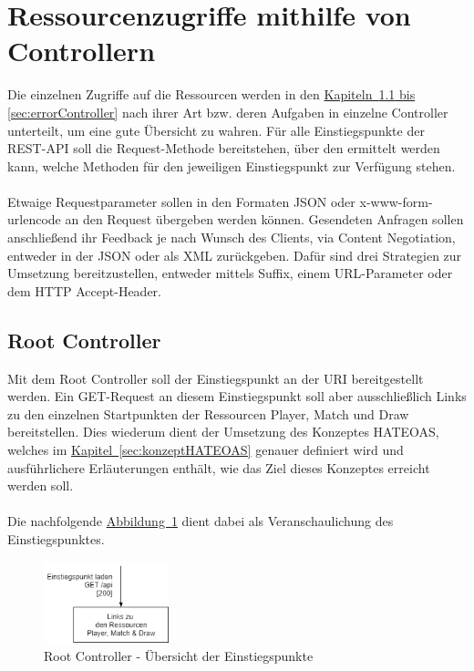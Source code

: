 \section{Ressourcenzugriffe mithilfe von Controllern}
Die einzelnen Zugriffe auf die Ressourcen werden in den \hyperref[sec:rootController, sec:errorController]{Kapiteln~\ref{sec:rootController} bis \ref{sec:errorController}} nach ihrer Art bzw. deren Aufgaben in einzelne Controller unterteilt, um eine gute Übersicht zu wahren. Für alle Einstiegspunkte der \gls{REST}-\gls{API} soll die Request-Methode  bereitstehen, über den ermittelt werden kann, welche Methoden für den jeweiligen Einstiegspunkt zur Verfügung stehen.\\
\\
Etwaige Requestparameter sollen in den Formaten \gls{JSON} oder x-www-form-urlencode an den Request übergeben werden können. Gesendeten Anfragen sollen anschließend ihr Feedback je nach Wunsch des Clients, via Content Negotiation, entweder in der \gls{JSON} oder als \gls{XML} zurückgeben. Dafür sind drei Strategien zur Umsetzung bereitzustellen, entweder mittels Suffix, einem URL-Parameter oder dem \gls{HTTP} Accept-Header. 

\subsection{Root Controller}\label{sec:rootController}
Mit dem Root Controller soll der Einstiegspunkt an der \gls{URI}  bereitgestellt werden. Ein GET-Request an diesem Einstiegspunkt soll aber ausschließlich Links zu den einzelnen Startpunkten der Ressourcen Player, Match und Draw bereitstellen. Dies wiederum dient der Umsetzung des Konzeptes HATEOAS, welches im \hyperref[sec:konzeptHATEOAS]{Kapitel~\ref{sec:konzeptHATEOAS}} genauer definiert wird und ausführlichere Erläuterungen enthält, wie das Ziel dieses Konzeptes erreicht werden soll.\\
\\
Die nachfolgende \hyperref[fig:rootController]{Abbildung~\ref{fig:rootController}} dient dabei als Veranschaulichung des Einstiegspunktes.\\
\begin{figure}[htb]
	\includegraphics[width=0.323\textwidth]{images/root-controller.png}
	\caption{Root Controller - Übersicht der Einstiegspunkte}
	\label{fig:rootController}
\end{figure}

